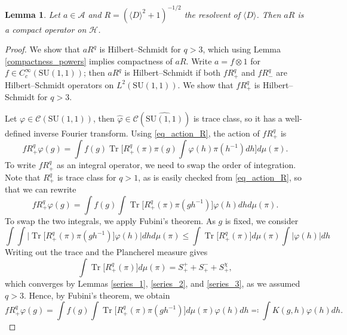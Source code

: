 \documentclass{amsart}
\newtheorem{lemma}[theorem]{Lemma}
\theoremstyle{definition}
\theoremstyle{remark}
\DeclareMathOperator{\Tr}{Tr}
\numberwithin{equation}{section}
\begin{document}
\begin{lemma}\label{compact_resolvent}
    Let $a\in\mathcal{A}$ and $R=(\langle D\rangle^2+1)^{-1/2}$ the resolvent of $\langle D\rangle$. Then $aR$ is a compact operator on $\mathcal{H}$.
\end{lemma}
\begin{proof}
    We show that $aR^q$ is Hilbert--Schmidt for $q>3$, which using Lemma \ref{compactness_powers} implies compactness of $aR$. Write $a=f\otimes 1$ for $f\in C_c^\infty(\mathrm{SU}(1,1))$; then $aR^q$ is Hilbert--Schmidt if both $fR_+^q$ and $fR_-^q$ are Hilbert--Schmidt operators on $L^2(\mathrm{SU}(1,1))$. We show that $fR_+^q$ is Hilbert--Schmidt for $q>3$. 

    Let $\varphi\in\mathcal{C}(\mathrm{SU}(1,1))$, then $\hat{\varphi}\in\mathcal{C}(\widehat{\mathrm{SU}(1,1)})$ is trace class, so it has a well-defined inverse Fourier transform. Using \eqref{eq_action_R}, the action of $fR_+^q$ is
    \begin{equation*}
        fR_+^q\varphi(g)=\int f(g)\Tr\bigg[R_+^q(\pi)\pi(g)\int\varphi(h)\pi(h^{-1})dh\bigg]d\mu(\pi).
    \end{equation*}
    To write $fR_+^q$ as an integral operator, we need to swap the order of integration. Note that $R_+^q$ is trace class for $q>1$, as is easily checked from \eqref{eq_action_R}, so that we can rewrite
    \begin{equation*}
        fR_+^q\varphi(g)=\int f(g) \int\Tr\big[R_+^q(\pi)\pi(gh^{-1})\big]\varphi(h)dhd\mu(\pi).
    \end{equation*}
    To swap the two integrals, we apply Fubini's theorem. As $g$ is fixed, we consider
    \begin{equation*}
        \int\int\Big|\Tr\big[R_+^q(\pi)\pi(gh^{-1})\big]\varphi(h)\Big|dhd\mu(\pi)\leq \int\Tr\big[R_+^q(\pi)\big]d\mu(\pi)\int|\varphi(h)|dh
    \end{equation*}
    Writing out the trace and the Plancherel measure gives
    \begin{equation*}
        \int\Tr\big[R_+^q(\pi)\big]d\mu(\pi)=S^+_++S^-_++S^\chi_+,
    \end{equation*}
    which converges by Lemmas \ref{series_1}, \ref{series_2}, and \ref{series_3}, as we assumed $q>3$. Hence, by Fubini's theorem, we obtain
    \begin{equation*}
        fR_+^q\varphi(g)=\int f(g)\int\Tr\big[R_+^q(\pi)\pi(gh^{-1})\big]d\mu(\pi)\varphi(h)dh\eqcolon\int K(g,h)\varphi(h)dh.
    \end{equation*}


\end{proof}
\end{document}
